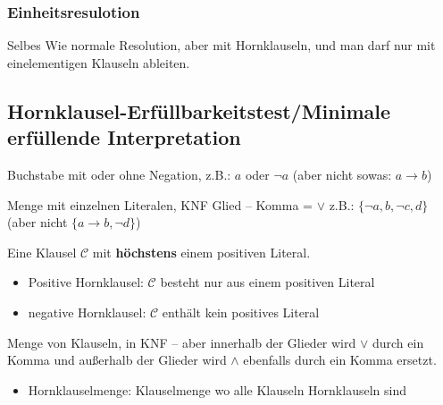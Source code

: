 \documentclass[
    ngerman,
    color=3b,
    summary,
    boxarc,
    main,
    fleqn,
    leqno,
]{rubos-tuda-template}
\begin{document}
    \subsubsection{Einheitsresulotion}
    Selbes Wie normale Resolution, aber mit Hornklauseln, und man darf nur mit einelementigen Klauseln ableiten.
    \clearpage
    \subsection{Hornklausel-Erfüllbarkeitstest/Minimale erfüllende Interpretation}
    \begin{definition}[Literal]
        Buchstabe mit oder ohne Negation, z.B.: $a$ oder $\lnot a$ (aber nicht sowas: $a\rightarrow{}b$)
    \end{definition}
    \begin{definition}[Klausel]
        Menge mit einzelnen Literalen, KNF Glied -- Komma = $\lor$ z.B.: $\{\lnot a, b,\lnot c, d\}$  (aber nicht $\{a\rightarrow{}b,\lnot d\}$)
    \end{definition}
    \begin{definition}[Hornklausel]
        Eine Klausel $\mathcal{C}$ mit \textbf{höchstens} einem positiven Literal.
        \begin{itemize}
            \item Positive Hornklausel: $\mathcal{C}$ besteht nur aus einem positiven Literal
            \item negative Hornklausel: $\mathcal{C}$ enthält kein positives Literal
        \end{itemize}
    \end{definition}
    \begin{definition}[Klauselmenge]
        Menge von Klauseln, in KNF -- aber innerhalb der Glieder wird $\lor$ durch ein Komma und außerhalb der Glieder wird $\land$ ebenfalls durch ein Komma ersetzt.
        \begin{itemize}
            \item Hornklauselmenge: Klauselmenge wo alle Klauseln Hornklauseln sind
        \end{itemize}
    \end{definition}
\end{document}
